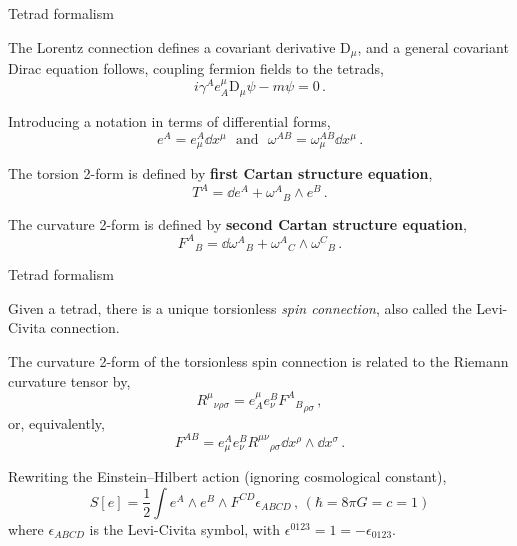 \documentclass{beamer}
\newcommand\boldtext[1]{\textcolor{bolds}{\textbf{#1}}}
\newcommand\italictext[1]{\textcolor{italics}{\textit{#1}}}
\begin{document}
\begin{frame}{Tetrad formalism}
    \begin{list}{\maltese}{\leftmargin=1em \itemindent=0em}
        \item<1-> The Lorentz connection defines a covariant derivative $\text{D}_\mu$, and a general covariant Dirac equation follows, coupling fermion fields to the tetrads,
        \begin{equation}\label{curved_Dirac}
            i\gamma^A e^\mu_A\text{D}_\mu \psi-m\psi=0\,.
        \end{equation}
        \item<2-> Introducing a notation in terms of differential forms,
        \begin{equation}
            e^A=e_\mu^A\dd{x^\mu}\,\,\,\,\text{and}\,\,\,\,\omega^{AB}=\omega_\mu^{AB}\dd{x^\mu}\,.
        \end{equation}
        \item<3-> The torsion 2-form is defined by \boldtext{first Cartan  structure equation},
        \begin{equation}\label{cartan1}
            T^A=\dd{e^A}+{\omega^A}_B\wedge e^B\,.
        \end{equation}
        \item<4-> The curvature 2-form is defined by \boldtext{second Cartan structure equation},
        \begin{equation}\label{cartan2}
            {F^A}_B=\dd{{\omega^A}_B}+{\omega^A}_C\wedge {\omega^C}_B\,.
        \end{equation}
    \end{list}
\end{frame}

\begin{frame}{Tetrad formalism}
    \begin{list}{\maltese}{\leftmargin=1em \itemindent=0em}
        \item<1-> Given a tetrad, there is a unique torsionless \italictext{spin connection}, also called the Levi-Civita connection.
        \item<2-> The curvature 2-form of the torsionless spin connection is related to the Riemann curvature tensor by,
        \begin{equation}
            {R^\mu}_{\nu\rho\sigma}=e^\mu_A e_\nu^B {{F^A}_B}_{\rho\sigma}\,,
        \end{equation}
        or, equivalently,
        \begin{equation}
            F^{AB}=e_\mu^A e_\nu^B {R^{\mu\nu}}_{\rho\sigma} \dd{x^\rho}\wedge\dd{x^\sigma}\,.
        \end{equation}
        \item<3-> Rewriting the Einstein–Hilbert action (ignoring cosmological constant),
        \begin{equation}\label{action_wedge1}
            S[e]=\frac{1}{2}\int e^A\wedge e^B\wedge F^{CD}\epsilon_{ABCD}\,, \,(\hbar=8\pi G=c=1)
        \end{equation}
        where $\epsilon_{ABCD}$ is the Levi-Civita symbol, with $\epsilon^{0123}=1=-\epsilon_{0123}$.
    \end{list}
\end{frame}
\end{document}
